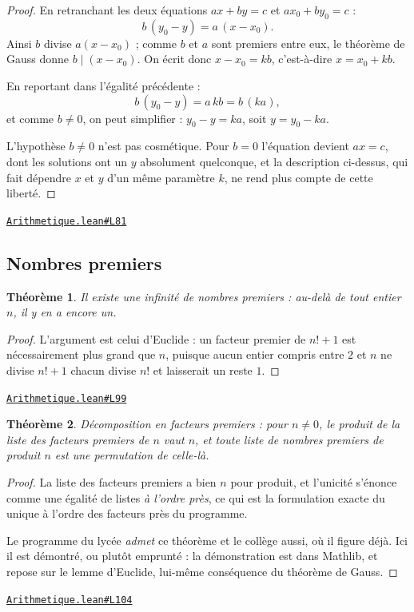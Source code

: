 \documentclass[11pt,a4paper]{article}
\theoremstyle{definition}
\theoremstyle{plain}
\newtheorem{theoreme}{Théorème}
\newcommand{\source}[2]{\par\smallskip\noindent\hfill{\footnotesize\href{#1}{\texttt{#2}}}\par\smallskip}
\begin{document}
\begin{proof}
En retranchant les deux équations $ax + by = c$ et $ax_0 + by_0 = c$ :
\[ b\,(y_0 - y) = a\,(x - x_0) . \]
Ainsi $b$ divise $a(x - x_0)$ ; comme $b$ et $a$ sont premiers entre eux, le théorème de
Gauss donne $b \mid (x - x_0)$. On écrit donc $x - x_0 = kb$, c'est-à-dire
$x = x_0 + kb$.

En reportant dans l'égalité précédente :
\[ b\,(y_0 - y) = a\,kb = b\,(ka) , \]
et comme $b \ne 0$, on peut simplifier : $y_0 - y = ka$, soit $y = y_0 - ka$.

\medskip\noindent
L'hypothèse $b \ne 0$ n'est pas cosmétique. Pour $b = 0$ l'équation devient $ax = c$, dont
les solutions ont un $y$ absolument quelconque, et la description ci-dessus, qui fait
dépendre $x$ et $y$ d'un même paramètre $k$, ne rend plus compte de cette liberté.
\end{proof}
\source{https://github.com/Commutator-IO/learn-lean/blob/main/courses/02-lycee/10-specialite-mathematiques-terminale-s/Arithmetique.lean\#L81}{Arithmetique.lean\#L81}

\subsection{Nombres premiers}

\begin{theoreme}
Il existe une infinité de nombres premiers : au-delà de tout entier $n$, il y en a encore
un.
\end{theoreme}

\begin{proof}
L'argument est celui d'Euclide : un facteur premier de
$n! + 1$ est nécessairement plus grand que $n$, puisque aucun entier compris entre $2$ et
$n$ ne divise $n! + 1$ \textemdash{} chacun divise $n!$ et laisserait un reste $1$.
\end{proof}
\source{https://github.com/Commutator-IO/learn-lean/blob/main/courses/02-lycee/10-specialite-mathematiques-terminale-s/Arithmetique.lean\#L99}{Arithmetique.lean\#L99}

\begin{theoreme}
Décomposition en facteurs premiers : pour $n \ne 0$, le produit de la liste des facteurs
premiers de $n$ vaut $n$, et toute liste de nombres premiers de produit $n$ est une
permutation de celle-là.
\end{theoreme}

\begin{proof}
La liste des facteurs premiers a bien $n$ pour produit, et l'unicité s'énonce comme une égalité de listes \emph{à l'ordre près},
ce qui est la formulation exacte du \og{} unique à l'ordre des facteurs près \fg{} du
programme.

\medskip\noindent
Le programme du lycée \emph{admet} ce théorème \textemdash{} et le collège aussi, où il
figure déjà. Ici il est démontré, ou plutôt emprunté : la démonstration est dans Mathlib,
et repose sur le lemme d'Euclide, lui-même conséquence du théorème de Gauss.
\end{proof}
\source{https://github.com/Commutator-IO/learn-lean/blob/main/courses/02-lycee/10-specialite-mathematiques-terminale-s/Arithmetique.lean\#L104}{Arithmetique.lean\#L104}
\end{document}
